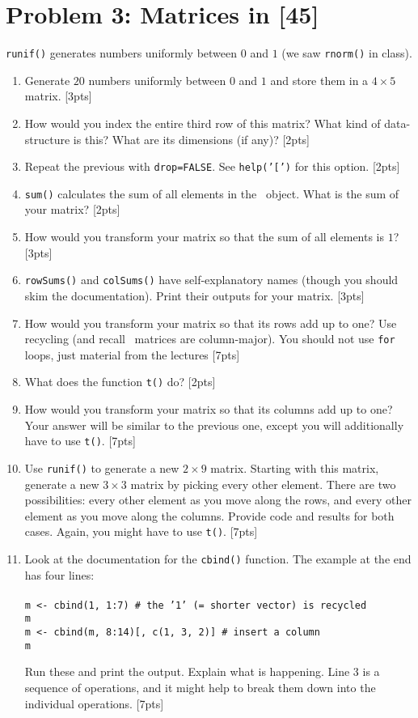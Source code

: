 \documentclass[10pt]{article}
\begin{document}
\section{Problem 3: Matrices in \R\hfill  [45]} 
  {\tt runif()} generates numbers uniformly between $0$ and $1$ (we saw {\tt rnorm()} in class).
\begin{enumerate}
  \item Generate $20$ numbers uniformly between $0$ and $1$ and store them in a $4 \times 5$ matrix. \hfill[3pts]
  \item How would you index the entire third row of this matrix? What kind of data-structure is this? 
    What are its dimensions (if any)? \hfill[2pts]
  \item Repeat the previous with {\tt drop=FALSE}. See {\tt help('[')} for this option. \hfill[2pts]
  \item {\tt sum()} calculates the sum of all elements in the \R\ object. What is the sum of your matrix? \hfill[2pts]
  \item How would you transform your matrix so that the sum of all elements is $1$? \hfill[3pts]
  \item {\tt rowSums()} and {\tt colSums()} have self-explanatory names (though you should skim the documentation).
    Print their outputs for your matrix. \hfill[3pts]
  \item How would you transform your matrix so that its rows add up to one? Use recycling (and recall \R\ matrices are column-major). 
    You should not use {\tt for} loops, just material from the lectures \hfill[7pts]
  \item What does the function {\tt t()} do? \hfill[2pts]
  \item How would you transform your matrix so that its columns add up to one? Your answer will be similar to the previous
    one, except you will additionally have to use {\tt t()}. \hfill[7pts]
  \item Use {\tt runif()} to generate a new $2 \times 9$ matrix. Starting with this matrix, generate a new $3 \times 3$ matrix
    by picking every other element. There are two possibilities: every other element as you move along the rows, and every other
    element as you move along the columns. Provide code and results for both cases. Again, you might have to use {\tt t()}. \hfill [7pts]
  \item Look at the documentation for the {\tt cbind()} function. The example at the end has four lines: \\~\\
    {\tt\qquad \qquad m <- cbind(1, 1:7) \# the '1' (= shorter vector) is recycled \\
\qquad  \qquad m \\
  \qquad\qquad m <- cbind(m, 8:14)[, c(1, 3, 2)] \# insert a column \\
  \qquad\qquad m
}

Run these and print the output. Explain what is happening. Line 3 is a sequence of operations, and it might help to break them
down into the individual operations. \hfill[7pts]
\end{enumerate}
\end{document}
